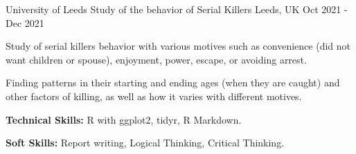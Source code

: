 \begin{cventries}
  \cventry
    {University of Leeds} %
    {Study of the behavior of Serial Killers} %
    {Leeds, UK} %
    {Oct 2021 - Dec 2021} %
    {
      \begin{cvitems} %
        \item {Study of serial killers behavior with various motives such as convenience (did not want children or spouse), enjoyment, power, escape, or avoiding arrest.}
        \item {Finding patterns in their starting and ending ages (when they are caught) and other factors of killing, as well as how it varies with different motives.}
        \item {\textbf{Technical Skills:} R with ggplot2, tidyr, R Markdown.}
        \item {\textbf{Soft Skills:} Report writing, Logical Thinking, Critical Thinking.}
      \end{cvitems}
    }

\end{cventries}
